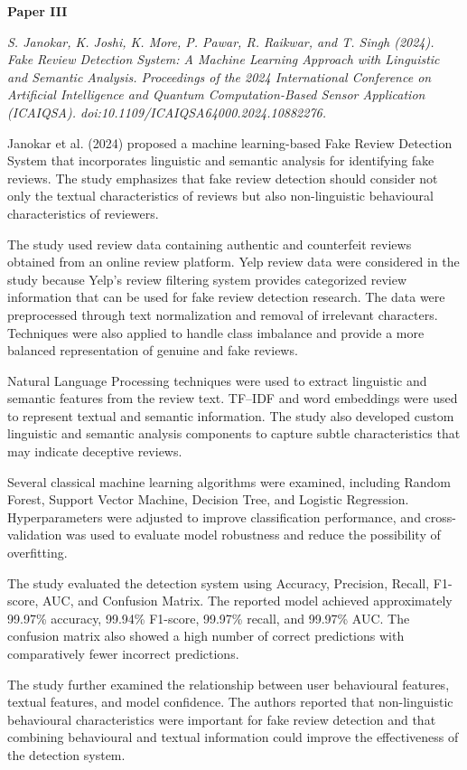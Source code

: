 \documentclass[12pt,a4paper]{report}
\begin{document}
\textbf{Paper III}

\textit{S. Janokar, K. Joshi, K. More, P. Pawar, R. Raikwar, and T. Singh (2024). Fake Review Detection System: A Machine Learning Approach with Linguistic and Semantic Analysis. Proceedings of the 2024 International Conference on Artificial Intelligence and Quantum Computation-Based Sensor Application (ICAIQSA). doi:10.1109/ICAIQSA64000.2024.10882276.}

Janokar et al. (2024) proposed a machine learning-based Fake Review Detection System that incorporates linguistic and semantic analysis for identifying fake reviews. The study emphasizes that fake review detection should consider not only the textual characteristics of reviews but also non-linguistic behavioural characteristics of reviewers.

The study used review data containing authentic and counterfeit reviews obtained from an online review platform. Yelp review data were considered in the study because Yelp's review filtering system provides categorized review information that can be used for fake review detection research. The data were preprocessed through text normalization and removal of irrelevant characters. Techniques were also applied to handle class imbalance and provide a more balanced representation of genuine and fake reviews.

Natural Language Processing techniques were used to extract linguistic and semantic features from the review text. TF--IDF and word embeddings were used to represent textual and semantic information. The study also developed custom linguistic and semantic analysis components to capture subtle characteristics that may indicate deceptive reviews.

Several classical machine learning algorithms were examined, including Random Forest, Support Vector Machine, Decision Tree, and Logistic Regression. Hyperparameters were adjusted to improve classification performance, and cross-validation was used to evaluate model robustness and reduce the possibility of overfitting.

The study evaluated the detection system using Accuracy, Precision, Recall, F1-score, AUC, and Confusion Matrix. The reported model achieved approximately 99.97\% accuracy, 99.94\% F1-score, 99.97\% recall, and 99.97\% AUC. The confusion matrix also showed a high number of correct predictions with comparatively fewer incorrect predictions.

The study further examined the relationship between user behavioural features, textual features, and model confidence. The authors reported that non-linguistic behavioural characteristics were important for fake review detection and that combining behavioural and textual information could improve the effectiveness of the detection system.
\end{document}
